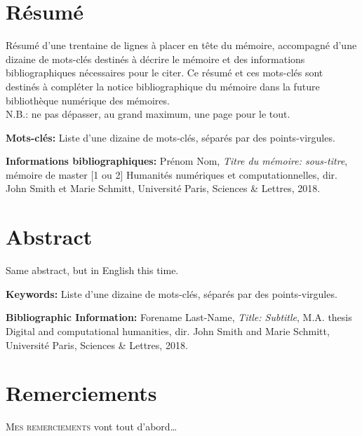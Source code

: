 \documentclass[a4paper,twoside,12pt]{book}
\begin{document}
\cleardoublepage

\section*{Résumé}

 Résumé d'une trentaine de lignes à placer en tête du mémoire, accompagné d'une dizaine de mots-clés destinés à décrire le mémoire et des informations bibliographiques nécessaires pour le citer. Ce résumé et ces mots-clés sont destinés à compléter la notice bibliographique du mémoire dans la future bibliothèque numérique des mémoires.\\
N.B.: ne pas dépasser, au grand maximum, une page pour le tout.

\medskip

\textbf{Mots-clés:} Liste d'une dizaine de mots-clés, séparés par des points-virgules.

\textbf{Informations bibliographiques:} Prénom Nom, \textit{Titre du mémoire: sous-titre}, mémoire de master [1 ou 2] \og Humanités numériques et computationnelles\fg{}, dir. John Smith et Marie Schmitt, Université Paris, Sciences \& Lettres, 2018.


\section*{Abstract}

Same abstract, but in English this time.

\medskip

\textbf{Keywords:} Liste d'une dizaine de mots-clés, séparés par des points-virgules.

\textbf{Bibliographic Information:} Forename Last-Name, \textit{Title: Subtitle}, M.A. thesis \og Digital and computational humanities\fg{}, dir. John Smith  and Marie Schmitt, Université Paris, Sciences \& Lettres, 2018.


\clearpage
\thispagestyle{empty}
\cleardoublepage


\section*{Remerciements}

\lettrine{M}{es remerciements} vont tout d'abord…

\clearpage
\thispagestyle{empty}
\cleardoublepage
\end{document}
